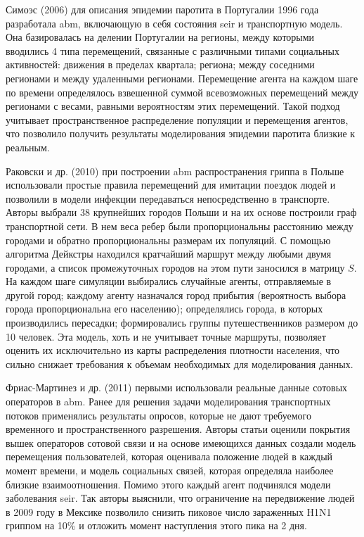 \documentclass[a4paper,12pt]{article} %
\begin{document}
Симоэс (2006) \cite{simoes2006modelling} для описания эпидемии паротита в Португалии 1996 года разработала \gls{abm}, включающую в себя состояния \gls{seir} и транспортную модель. Она базировалась на делении Португалии на регионы, между которыми вводились 4 типа перемещений, связанные с различными типами социальных активностей: движения в пределах квартала; региона; между соседними регионами и между удаленными регионами. Перемещение агента на каждом шаге по времени определялось взвешенной суммой всевозможных перемещений между регионами с весами, равными вероятностям этих перемещений. Такой подход учитывает пространственное распределение популяции и перемещения агентов, что позволило получить результаты моделирования эпидемии паротита близкие к реальным.

Раковски и др. (2010) \cite{rakowski2010influenza} при построении \gls{abm} распространения гриппа в Польше использовали простые правила перемещений для имитации поездок людей и позволили в модели инфекции передаваться непосредственно в транспорте. Авторы выбрали 38 крупнейших городов Польши и на их основе построили граф транспортной сети. В нем веса ребер были пропорциональны расстоянию между городами и обратно пропорциональны размерам их популяций. С помощью алгоритма Дейкстры находился кратчайший маршрут между любыми двумя городами, а список промежуточных городов на этом пути заносился в матрицу $S$. На каждом шаге симуляции выбирались случайные агенты, отправляемые в другой город; каждому агенту назначался город прибытия (вероятность выбора города пропорциональна его населению); определялись города, в которых производились пересадки; формировались группы путешественников размером до 10 человек. Эта модель, хоть и не учитывает точные маршруты, позволяет оценить их исключительно из карты распределения плотности населения, что сильно снижает требования к объемам необходимых для моделирования данных.

Фриас-Мартинез и др. (2011) \cite{frias2011agent} первыми использовали реальные данные сотовых операторов в \gls{abm}. Ранее для решения задачи моделирования транспортных потоков применялись результаты опросов, которые не дают требуемого временного и пространственного разрешения. Авторы статьи оценили покрытия вышек операторов сотовой связи и на основе имеющихся данных создали модель перемещения пользователей, которая оценивала положение людей в каждый момент времени, и модель социальных связей, которая определяла наиболее близкие взаимоотношения. Помимо этого каждый агент подчинялся модели заболевания \gls{seir}. Так авторы выяснили, что ограничение на передвижение людей в 2009 году в Мексике позволило снизить пиковое число зараженных H1N1 гриппом на 10\% и отложить момент наступления этого пика на 2 дня.
\end{document}
